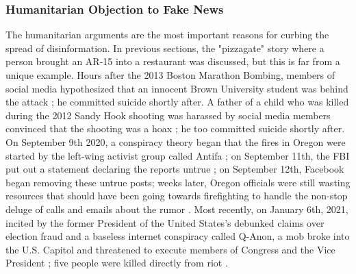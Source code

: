 \documentclass[preprint,review,12pt]{elsarticle}
\begin{document}
\subsubsection{Humanitarian Objection to Fake News}
\label{Humanitarian Objection to Fake News Section}
The humanitarian arguments are the most important reasons for curbing the spread of disinformation. In previous sections, the "pizzagate" story where a person brought an AR-15 into a restaurant was discussed, but this is far from a unique example. Hours after the 2013 Boston Marathon Bombing, members of social media hypothesized that an innocent Brown University student was behind the attack \cite{starbird2014rumors}; he committed suicide shortly after. A father of a child who was killed during the 2012 Sandy Hook shooting was harassed by social media members convinced that the shooting was a hoax \cite{williamson2019alex}; he too committed suicide shortly after. On September 9th 2020, a conspiracy theory began that the fires in Oregon were started by the left-wing activist group called Antifa \cite{robinson2020oregon}; on September 11th, the FBI put out a statement declaring the reports untrue \cite{fbi2020portland}; on September 12th, Facebook began removing these untrue posts; weeks later, Oregon officials were still wasting resources that should have been going towards firefighting to handle the non-stop deluge of calls and emails about the rumor \cite{wilson2020oregon}. Most recently, on January 6th, 2021, incited by the former President of the United States's debunked claims over election fraud and a baseless internet conspiracy called Q-Anon, a mob broke into the U.S. Capitol and threatened to execute members of Congress and the Vice President \cite{fandos2021trump}; five people were killed directly from riot \cite{Levenson2021capitol}.
\end{document}
